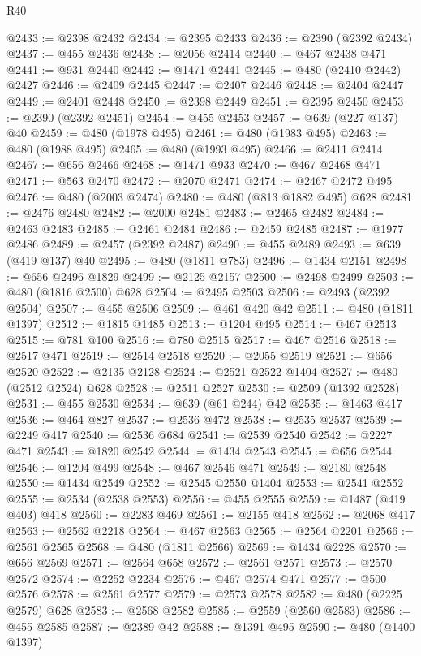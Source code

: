 \begin{lexlean}{R40}
\begin{coremodule}
{{{{{{{{{{{{{{{{{{{{{{{{{{{{{{{{{{{{{{{{{{{{{{{{{{{{{{{{{{{{{{{{{{{{{{{{{{{{{{{{{{{{{{{{{{{{{{{{{{{{{{{{{{{{{@2433 := @2398 @2432
@2434 := @2395 @2433
@2436 := @2390 (@2392 @2434)
@2437 := @455 @2436
@2438 := @2056 @2414
@2440 := @467 @2438 @471
@2441 := @931 @2440
@2442 := @1471 @2441
@2445 := @480 (@2410 @2442) @2427
@2446 := @2409 @2445
@2447 := @2407 @2446
@2448 := @2404 @2447
@2449 := @2401 @2448
@2450 := @2398 @2449
@2451 := @2395 @2450
@2453 := @2390 (@2392 @2451)
@2454 := @455 @2453
@2457 := @639 (@227 @137) @40
@2459 := @480 (@1978 @495)
@2461 := @480 (@1983 @495)
@2463 := @480 (@1988 @495)
@2465 := @480 (@1993 @495)
@2466 := @2411 @2414
@2467 := @656 @2466
@2468 := @1471 @933
@2470 := @467 @2468 @471
@2471 := @563 @2470
@2472 := @2070 @2471
@2474 := @2467 @2472 @495
@2476 := @480 (@2003 @2474)
@2480 := @480 (@813 @1882 @495) @628
@2481 := @2476 @2480
@2482 := @2000 @2481
@2483 := @2465 @2482
@2484 := @2463 @2483
@2485 := @2461 @2484
@2486 := @2459 @2485
@2487 := @1977 @2486
@2489 := @2457 (@2392 @2487)
@2490 := @455 @2489
@2493 := @639 (@419 @137) @40
@2495 := @480 (@1811 @783)
@2496 := @1434 @2151
@2498 := @656 @2496 @1829
@2499 := @2125 @2157
@2500 := @2498 @2499
@2503 := @480 (@1816 @2500) @628
@2504 := @2495 @2503
@2506 := @2493 (@2392 @2504)
@2507 := @455 @2506
@2509 := @461 @420 @42
@2511 := @480 (@1811 @1397)
@2512 := @1815 @1485
@2513 := @1204 @495
@2514 := @467 @2513
@2515 := @781 @100
@2516 := @780 @2515
@2517 := @467 @2516
@2518 := @2517 @471
@2519 := @2514 @2518
@2520 := @2055 @2519
@2521 := @656 @2520
@2522 := @2135 @2128
@2524 := @2521 @2522 @1404
@2527 := @480 (@2512 @2524) @628
@2528 := @2511 @2527
@2530 := @2509 (@1392 @2528)
@2531 := @455 @2530
@2534 := @639 (@61 @244) @42
@2535 := @1463 @417
@2536 := @464 @827
@2537 := @2536 @472
@2538 := @2535 @2537
@2539 := @2249 @417
@2540 := @2536 @684
@2541 := @2539 @2540
@2542 := @2227 @471
@2543 := @1820 @2542
@2544 := @1434 @2543
@2545 := @656 @2544
@2546 := @1204 @499
@2548 := @467 @2546 @471
@2549 := @2180 @2548
@2550 := @1434 @2549
@2552 := @2545 @2550 @1404
@2553 := @2541 @2552
@2555 := @2534 (@2538 @2553)
@2556 := @455 @2555
@2559 := @1487 (@419 @403) @418
@2560 := @2283 @469
@2561 := @2155 @418
@2562 := @2068 @417
@2563 := @2562 @2218
@2564 := @467 @2563
@2565 := @2564 @2201
@2566 := @2561 @2565
@2568 := @480 (@1811 @2566)
@2569 := @1434 @2228
@2570 := @656 @2569
@2571 := @2564 @658
@2572 := @2561 @2571
@2573 := @2570 @2572
@2574 := @2252 @2234
@2576 := @467 @2574 @471
@2577 := @500 @2576
@2578 := @2561 @2577
@2579 := @2573 @2578
@2582 := @480 (@2225 @2579) @628
@2583 := @2568 @2582
@2585 := @2559 (@2560 @2583)
@2586 := @455 @2585
@2587 := @2389 @42
@2588 := @1391 @495
@2590 := @480 (@1400 @1397)
}}}}}}}}}}}}}}}}}}}}}}}}}}}}}}}}}}}}}}}}}}}}}}}}}}}}}}}}}}}}}}}}}}}}}}}}}}}}}}}}}}}}}}}}}}}}}}}}}}}}}}}}}}}}}
\end{coremodule}
\end{lexlean}
